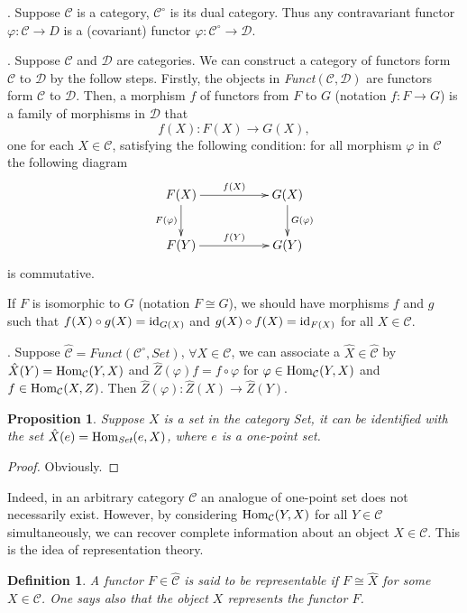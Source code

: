 \documentclass[9pt]{extarticle}
\theoremstyle{plain}
\newtheorem{pro}{Proposition}
\newtheorem{defi}{Definition}
\newcommand{\cc}{\mathcal{C}}
\begin{document}
. Suppose $\cc$ is a category, $\cc^\circ$ is its dual category. Thus any contravariant functor $\varphi:\cc\to D$ is a (covariant) functor $\varphi:\cc^\circ\to \mathcal{D}$.

. Suppose $\cc$ and $\mathcal{D}$ are categories. We can construct a category of functors form $\cc$ to $\mathcal{D}$ by the follow steps. Firstly, the objects in \textit{Funct}$(\cc,\mathcal{D})$ are functors form $\cc$ to $\mathcal{D}$. Then, a morphism $f$ of functors from $F$ to $G$ (notation $f:F\to G$) is a family of morphisms in $\mathcal{D}$ that
\[
	f(X):F(X)\to G(X),
\]
one for each $X\in \cc$, satisfying the following condition: for all morphism $\varphi$ in $\cc$ the following diagram
\[
\begin{xy}
	\xymatrix
	{
		F(X)\ar[rr]^{f(X)} \ar[d]_{F(\varphi)}&&G(X) \ar[d]^{G(\varphi)}\\
		F(Y)\ar[rr]^{f(Y)}&&G(Y)
	}
\end{xy}
\]
is commutative.

If $F$ is isomorphic to $G$ (notation $F\cong G$), we should have morphisms $f$ and $g$ such that $f(X)\circ g(X)=\operatorname{id}_{G(X)}$ and $g(X)\circ f(X)=\operatorname{id}_{F(X)}$ for all $X\in \cc$.

. Suppose $\hat{\cc}=\textit{Funct}(\cc^\circ,\textit{Set})$, $\forall X\in \cc$, we can associate a $\hat{X}\in \hat{\cc}$ by $\hat{X}(Y)=\Hom_\cc(Y,X)$ and $\hat{Z}(\varphi)f=f\circ \varphi$ for $\varphi \in \Hom_\cc(Y,X)$ and $f\in \Hom_\cc(X,Z)$. Then $\hat{Z}(\varphi):\hat{Z}(X)\to \hat{Z}(Y)$.

\begin{pro}
	Suppose $X$ is a set in the category \textit{Set}, it can be identified with the set $\hat{X}(e)=\operatorname{Hom}_{\textit{Set}}(e,X)$, where $e$ is a one-point set.
\end{pro}
\begin{proof}
	Obviously.
\end{proof}

Indeed, in an arbitrary category $\cc$ an analogue of one-point set does not necessarily exist. However, by considering $\Hom_{\cc}(Y,X)$ for all $Y\in \cc$ simultaneously, we can recover complete information about an object $X\in \cc$. This is the idea of representation theory.

\begin{defi}
	A functor $F\in \hat{\cc}$ is said to be representable if $F\cong \hat{X}$ for some $X\in \cc$. One says also that the object $X$ represents the functor $F$.
\end{defi}
\end{document}
